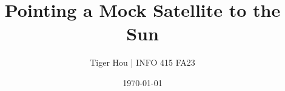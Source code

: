 

\setlength{\headheight}{16pt}
\setlength{\footskip}{36pt}

\title{\vspace{-0.6in}Pointing a Mock Satellite to the Sun\vspace{-0.1in}}
\author{Tiger Hou  |  INFO 415 FA23}
\date{\today\vspace{-0.2in}}

\fancyhf{}



\maketitle
\thispagestyle{firstpagestyle}



% 
% 

